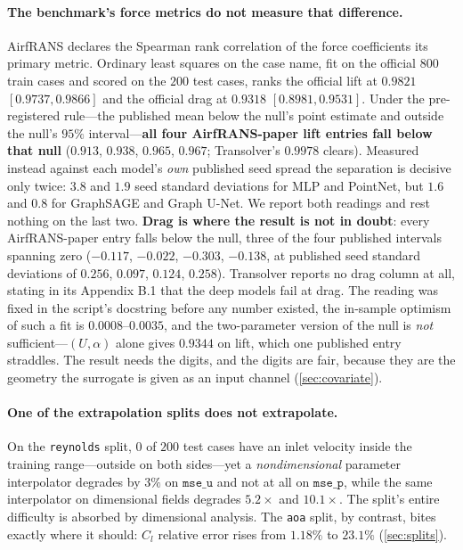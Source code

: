 \paragraph{The benchmark's force metrics do not measure that difference.} AirfRANS
declares the Spearman rank correlation of the force coefficients its primary metric.
Ordinary least squares on the case name, fit on the official $800$ train cases and
scored on the $200$ test cases, ranks the official lift at $\mathbf{0.9821}$
$[0.9737,0.9866]$ and the official drag at $\mathbf{0.9318}$ $[0.8981,0.9531]$. Under the
pre-registered rule---the published mean below the null's point estimate and outside the
null's $95\%$ interval---\textbf{all four AirfRANS-paper lift entries fall below that null}
($0.913$, $0.938$, $0.965$, $0.967$; Transolver's $0.9978$ clears). Measured instead
against each model's \emph{own} published seed spread the separation is decisive only
twice: $3.8$ and $1.9$ seed standard deviations for MLP and PointNet, but $1.6$ and $0.8$
for GraphSAGE and Graph U-Net. We report both readings and rest nothing on the last two.
\textbf{Drag is where the result is not in doubt}: every
AirfRANS-paper entry falls below the null, three of the four published intervals spanning zero
($-0.117$, $-0.022$, $-0.303$, $-0.138$, at published seed standard deviations of
$0.256$, $0.097$, $0.124$, $0.258$). Transolver reports no drag column at all, stating in
its Appendix B.1 that the deep models fail at drag. The reading was fixed in the script's
docstring before any number existed, the in-sample optimism of such a fit is
$0.0008$--$0.0035$, and the two-parameter version of the null is \emph{not}
sufficient---$(U,\alpha)$ alone gives $0.9344$ on lift, which one published entry
straddles. The result needs the digits, and the digits are fair, because they are the
geometry the surrogate is given as an input channel (\autoref{sec:covariate}).



\paragraph{One of the extrapolation splits does not extrapolate.} On the
\texttt{reynolds} split, $0$ of $200$ test cases have an inlet velocity inside the
training range---outside on both sides---yet a \emph{nondimensional} parameter
interpolator degrades by $3\%$ on $\texttt{mse\_u}$ and not at all on $\texttt{mse\_p}$,
while the same interpolator on dimensional fields degrades $5.2\times$ and $10.1\times$.
The split's entire difficulty is absorbed by dimensional analysis. The \texttt{aoa}
split, by contrast, bites exactly where it should: $C_l$ relative error rises from
$1.18\%$ to $23.1\%$ (\autoref{sec:splits}).


